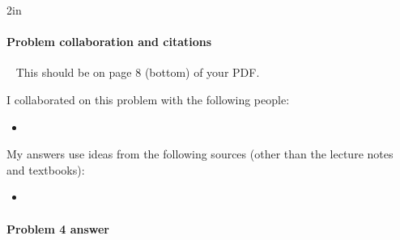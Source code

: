 
\begin{answerBox}{2in}          %

  
  \paragraph{Problem  collaboration and citations}~\GradescopeComment
  {This should be on page 8 (bottom) of your PDF.}

  I collaborated on this problem with the following people:
  \begin{blue}
    \begin{itemize}
    \item \REPLACEME            %
    \end{itemize}
  \end{blue}

  My answers use ideas from the following sources (other than the lecture notes and textbooks): 
  \begin{blue}
    \begin{itemize}
    \item \REPLACEME            %
    \end{itemize}
  \end{blue}

\end{answerBox}

\newpage

\paragraph{Problem 4 answer}

